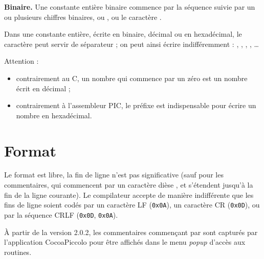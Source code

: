 \textbf{Binaire.} Une constante entière binaire commence par la séquence  suivie par un ou plusieurs chiffres binaires,  ou , ou le caractère \piccolo{\_}.

Dans une constante entière, écrite en binaire, décimal ou en hexadécimal, le caractère \piccolo{\_} peut servir de séparateur ; on peut ainsi écrire indifféremment : , , , , \dots

Attention :
\begin{itemize}
  \item contrairement au C, un nombre qui commence par un zéro est un nombre écrit en décimal ;
  \item contrairement à l’assembleur PIC, le préfixe  est indispensable pour écrire un nombre en hexadécimal.
\end{itemize}

\section{Format}

Le format est libre, la fin de ligne n’est pas significative (sauf pour les commentaires, qui commencent par un caractère dièse \piccolo{\#}, et s’étendent jusqu’à la fin de la ligne courante). Le compilateur accepte de manière indifférente que les fins de ligne soient codés par un caractère LF (\texttt{0x0A}), un caractère CR (\texttt{0x0D}), ou par la séquence CRLF (\texttt{0x0D}, \texttt{0x0A}).

À partir de la version 2.0.2, les commentaires commençant par \piccolo{\#!} sont capturés par l'application CocoaPiccolo pour être affichés dans le menu \emph{popup} d'accès aux routines.

